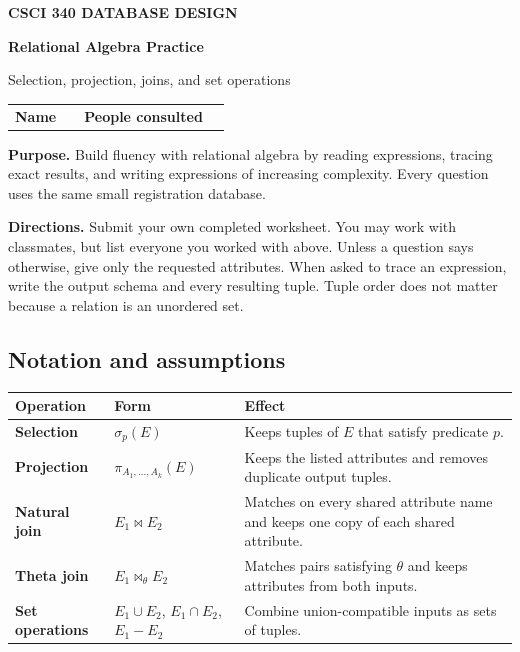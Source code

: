 \documentclass[11pt]{article}
\begin{document}
{\small\bfseries CSCI 340 \quad DATABASE DESIGN}\par
\vspace{4pt}
{\fontsize{22}{25}\selectfont\bfseries Relational Algebra Practice}\par
{\large Selection, projection, joins, and set operations}\par
\vspace{9pt}

\begin{tabularx}{\linewidth}{@{}>{\bfseries}l X >{\bfseries}l X@{}}
Name & \hrulefill & People consulted & \hrulefill \\
\end{tabularx}

\vspace{8pt}
\textbf{Purpose.} Build fluency with relational algebra by reading expressions, tracing exact results, and writing expressions of increasing complexity. Every question uses the same small registration database.

\textbf{Directions.} Submit your own completed worksheet. You may work with classmates, but list everyone you worked with above. Unless a question says otherwise, give only the requested attributes. When asked to trace an expression, write the output schema and every resulting tuple. Tuple order does not matter because a relation is an unordered set.


\subsection*{Notation and assumptions}

\begin{tabularx}{\linewidth}{@{}>{\bfseries}p{1.15in} >{\centering\arraybackslash}p{1.25in} X@{}}
\toprule
Operation & Form & Effect \\
\midrule
Selection & $\sigma_p(E)$ & Keeps tuples of $E$ that satisfy predicate $p$. \\
Projection & $\pi_{A_1,\ldots,A_k}(E)$ & Keeps the listed attributes and removes duplicate output tuples. \\
Natural join & $E_1 \bowtie E_2$ & Matches on every shared attribute name and keeps one copy of each shared attribute. \\
Theta join & $E_1 \bowtie_{\theta} E_2$ & Matches pairs satisfying $\theta$ and keeps attributes from both inputs. \\
Set operations & $E_1\cup E_2$, $E_1\cap E_2$, $E_1-E_2$ & Combine union-compatible inputs as sets of tuples. \\
\bottomrule
\end{tabularx}
\end{document}
